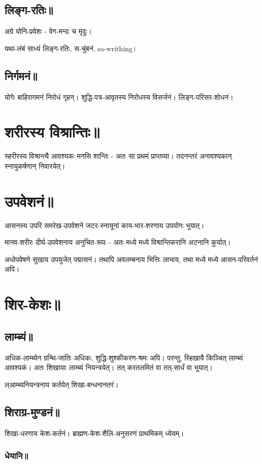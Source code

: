 \documentclass[oneside, article]{memoir}
\begin{document}
\section{लिङ्ग-रतिः॥}
अग्रे योनि-प्रवेशः - वेग-मन्दः च मृदुः।

यथा-लंबं साध्यं लिङ्ग-रतिः, स-चुंबनं, sa-writhing।

\section{निर्गमनं॥}
योगेः बाहिरागमनं निरोधं गृहन्। शुद्धि-पत्र-आवृतस्य निरोधस्य विसर्जनं। लिङ्ग-परिसर-शोधनं।

\chapter{शरीरस्य विश्रान्तिः॥}
स्हरीरस्य विश्रान्त्यै आवश्यकः मनसि शान्तिः - अतः सा प्रथमं प्राप्तव्या। तदनन्तरं अनावश्यकान् स्नायुकर्षणान् निवारयेत्।

\chapter{उपवेशनं॥}
आसनस्य उपरि समरेख-उपवेशने जटर-स्नायूनां काय-भार-शरणाय उपयोगः भूयात्।

मानव-शरीरः दीर्घ-उपवेशनाय अनुचित-रूपः - अतः मध्ये मध्ये विश्रान्तिकरानि अटनानि कुर्यात्।

अधोपवेषणे सुखाय उपयुजेत् पद्मासनं। तथापि अवलम्बनाय भित्तिः लाभाय, तथा‌ मध्ये मध्ये आसन-परिवर्तनं अपि।

\chapter{शिर-केशः॥}
\section{लाम्ब्यं॥}
अधिक-लाम्ब्येन ग्रन्थि-जातिः अधिकः, शुद्धि-शुश्कीकरण-श्रमः अपि। परन्तु, स्हिखायै किञ्चित् लाम्ब्यं आवश्यकं। अतः शिखायाः लाम्ब्यं नियन्त्रयेत्। तत् करतलमितं वा तत्-सार्धं वा भूयात्।

ल्आम्ब्यनियन्त्रनाय कर्तयेत् शिखा-बन्धनानतरं।

\section{शिराग्र-मुण्डनं॥}
शिखा-धरणाय केश-कर्तनं। ब्राह्मण-केश-शैलि-अनुसरणं प्राथमिकम् ध्येयम्।

\subsection{धेयानि॥}
\end{document}
